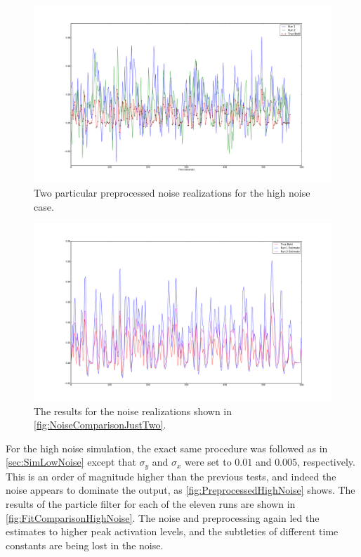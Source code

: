 \begin{figure}
\includegraphics[clip=true,trim=6cm 2cm 5cm 3.5cm,width=15cm]{images/highnoise_56_noise}
\caption{Two particular preprocessed noise realizations for the high noise case.}
\label{fig:NoiseComparisonJustTwo}
\end{figure}

\begin{figure}
\includegraphics[clip=true,trim=6cm 2cm 5cm 3.5cm,width=15cm]{images/comparison_highnoise_just2}
\caption{The results for the noise realizations shown in \autoref{fig:NoiseComparisonJustTwo}.}
\label{fig:FitComparisonHighNoiseJust2}
\end{figure}

For the high noise simulation, the exact same procedure was followed as in \autoref{sec:SimLowNoise}
except that $\sigma_y$ and $\sigma_x$ were set to $0.01$ and $0.005$,
respectively. This is an order of magnitude higher than the previous tests, and indeed the
noise appears to dominate the output, as \autoref{fig:PreprocessedHighNoise} shows. 
The results of the particle filter
for each of the eleven runs are shown in \autoref{fig:FitComparisonHighNoise}. 
The noise and preprocessing again led the estimates
to higher peak activation levels, and the subtleties of different time constants 
are being lost in the noise. 

